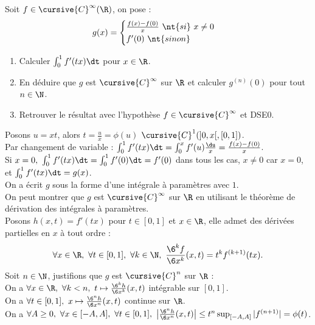 \documentclass[11pt]{article}
\begin{document}
\begin{ex}{}{}
    Soit $f\in\cursive{C}^{\infty}(\R)$, on pose :
    \begin{equation*}
        g(x) = \begin{cases}
            \frac{f(x)-f(0)}{x} ~ \nt{si} ~ x\neq0\\
            f'(0) ~ \nt{sinon}
        \end{cases}
    \end{equation*}
    \begin{enumerate}
        \item Calculer $\int_0^1 f'(tx)\dt$ pour $x\in\R$.
        \item En déduire que $g$ est $\cursive{C}^\infty$ sur $\R$ et calculer $g^{(n)}(0)$ pour tout $n\in\N$.
        \item Retrouver le résultat avec l'hypothèse $f\in\cursive{C}^{\infty}$ et DSE0.
    \end{enumerate}
    \tcblower
     Posons $u=xt$, alors $t=\frac{u}{x}=\phi(u)$ $\cursive{C}^1(]0,x[,[0,1])$.\\
    Par changement de variable : $\int_0^1 f'(tx)\dt = \int_0^x f'(u)\frac{\du}{x} = \frac{f(x)-f(0)}{x}$.\\
    Si $x=0, ~ \int_0^1 f'(tx)\dt = \int_0^1f'(0)\dt=f'(0)$ dans tous les cas, $x\neq0$ car $x=0$, et $\int_0^1 f'(tx)\dt=g(x)$.\\
     On a écrit $g$ sous la forme d'une intégrale à paramètres avec $1.$\\
    On peut montrer que $g$ est $\cursive{C}^{\infty}$ sur $\R$ en utilisant le théorème de dérivation des intégrales à paramètres.\\
    Posons $h(x,t)=f'(tx)$ pour $t\in[0,1]$ et $x\in\R$, elle admet des dérivées partielles en $x$ à tout ordre :
    \begin{equation*}
        \forall x \in \R, ~ \forall t \in [0,1], ~ \forall k \in \N, ~ \frac{\6^k f}{\6 x^k}(x,t) = t^k f^{(k+1)}(tx).
    \end{equation*}
    Soit $n\in\N$, justifions que $g$ est $\cursive{C}^n$ sur $\R$ :\\
    On a $\forall x \in \R, ~ \forall k < n, ~ t\mapsto \frac{\6^k h}{\6 x^k}(x,t)$ intégrable sur $[0,1]$.\\
    On a $\forall t \in [0,1], ~ x\mapsto \frac{\6^n h}{\6 x^n}(x,t)$ continue sur $\R$.\\
    On a $\forall A \geq 0, ~ \forall x \in [-A,A], ~ \forall t \in [0,1], ~ \left|\frac{\6^n h}{\6 x^n}(x,t)\right|\leq t^n\sup_{[-A,A]}|f^{(n+1)}|=\phi(t)$.\\

\end{ex}
\end{document}
